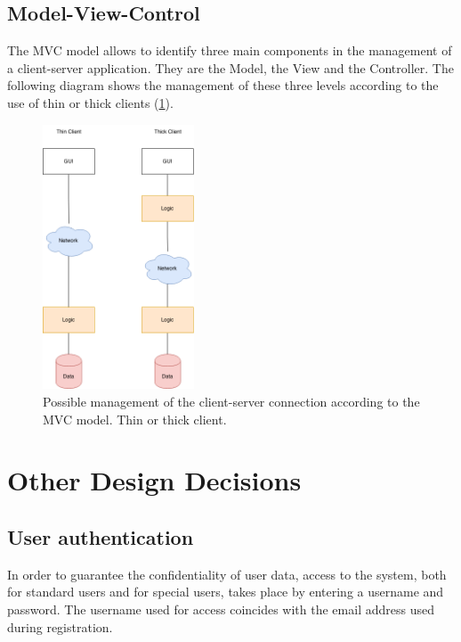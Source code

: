 \subsection{Model-View-Control}
The MVC model allows to identify three main components in the management of a client-server application. They are the Model, the View and the Controller.
The following diagram shows the management of these three levels according to the use of thin or thick clients (\ref{img:client_server}).

\begin{figure}[H]
  \begin{center}
  	\includegraphics[width=0.4\textwidth]{./img/client_server.png}
    \hspace{0.05\linewidth}
    \centering
    \caption{Possible management of the client-server connection according to the MVC model. Thin or thick client.}
		\label{img:client_server}
    \end{center}
\end{figure}


\section{Other Design Decisions}
\subsection{User authentication}
In order to guarantee the confidentiality of user data, access to the system, both for standard users and for special users, takes place by entering a username and password.
The username used for access coincides with the email address used during registration.

